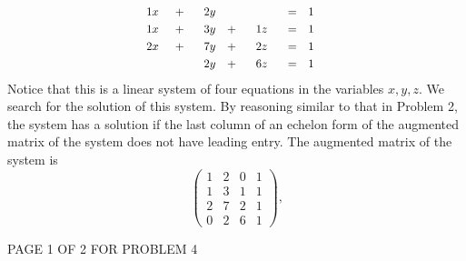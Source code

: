 \documentclass[12pt]{article}
\newenvironment{problem}[2][Problem]
{
	\begin{trivlist} 
		\item[\hskip \labelsep {\bfseries #1 #2:}]
	}
{
	\end{trivlist}
	}
\newenvironment{solution}[1][Solution]
{
	\begin{trivlist} 
		\item[\hskip \labelsep {\itshape #1:}]
	}
	{
	\end{trivlist}
}
\begin{document}
\begin{problem}{4}
\begin{solution}
\begin{align*}
&&&&&&&& &&&&&&&& &&&&&&&& &1x& &+& &2y& &\hphantom{500}& &\hphantom{500}& &=& &1& &&&&&&&& &&&&&&&& &&&&&&&& \\
&&&&&&&& &&&&&&&& &&&&&&&& &1x& &+& &3y& &+& &1z& &=& &1& &&&&&&&& &&&&&&&& &&&&&&&& \\
&&&&&&&& &&&&&&&& &&&&&&&& &2x& &+& &7y& &+& &2z& &=& &1& &&&&&&&& &&&&&&&& &&&&&&&& \\
&&&&&&&& &&&&&&&& &&&&&&&& &\hphantom{500}& &\hphantom{500}& &2y& &+& &6z& &=& &1& &&&&&&&& &&&&&&&&  &&&&&&&& 
\end{align*}
Notice that this is a linear system of four equations in the variables $x,y,z$. We search for the solution of this system. By reasoning similar to that in Problem 2, the system has a solution if the last column of an echelon form of the augmented matrix of the system does not have leading entry. The augmented matrix of the system is
\[
\begin{pmatrix}1&2&0&1\\1&3&1&1\\2&7&2&1\\0&2&6&1\end{pmatrix}\text{,}
\]
\vfill
\centerline{PAGE 1 OF 2 FOR PROBLEM 4}
\end{solution}
\end{problem}
\end{document}
